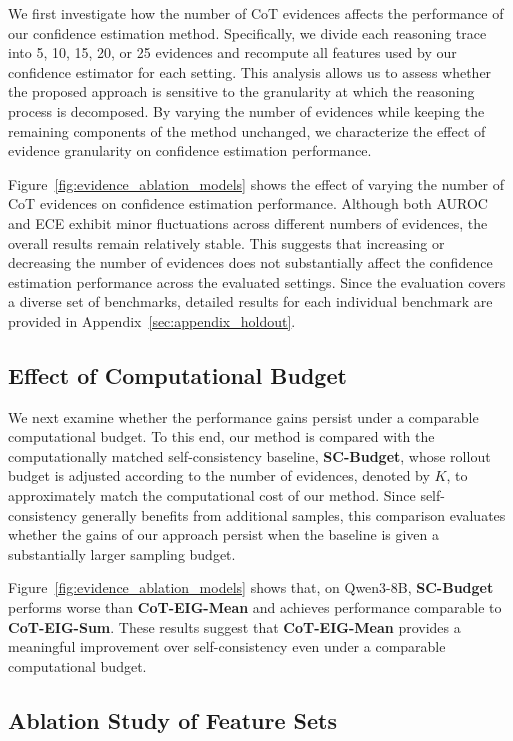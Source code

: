 \documentclass{article} %
\begin{document}
We first investigate how the number of CoT evidences affects the performance of our confidence estimation method. Specifically, we divide each reasoning trace into 5, 10, 15, 20, or 25 evidences and recompute all features used by our confidence estimator for each setting. This analysis allows us to assess whether the proposed approach is sensitive to the granularity at which the reasoning process is decomposed. By varying the number of evidences while keeping the remaining components of the method unchanged, we characterize the effect of evidence granularity on confidence estimation performance.

Figure~\ref{fig:evidence_ablation_models} shows the effect of varying the number of CoT evidences on confidence estimation performance. Although both AUROC and ECE exhibit minor fluctuations across different numbers of evidences, the overall results remain relatively stable. This suggests that increasing or decreasing the number of evidences does not substantially affect the confidence estimation performance across the evaluated settings. Since the evaluation covers a diverse set of benchmarks, detailed results for each individual benchmark are provided in Appendix~\ref{sec:appendix_holdout}.

\subsection{Effect of Computational Budget}

We next examine whether the performance gains persist under a comparable computational budget. To this end, our method is compared with the computationally matched self-consistency baseline, \textbf{SC-Budget}, whose rollout budget is adjusted according to the number of evidences, denoted by $K$, to approximately match the computational cost of our method. Since self-consistency generally benefits from additional samples, this comparison evaluates whether the gains of our approach persist when the baseline is given a substantially larger sampling budget.

Figure~\ref{fig:evidence_ablation_models} shows that, on Qwen3-8B, \textbf{SC-Budget} performs worse than \textbf{CoT-EIG-Mean} and achieves performance comparable to \textbf{CoT-EIG-Sum}. These results suggest that \textbf{CoT-EIG-Mean} provides a meaningful improvement over self-consistency even under a comparable computational budget.


\subsection{Ablation Study of Feature Sets}
\label{sec:ablation_features}
\end{document}
